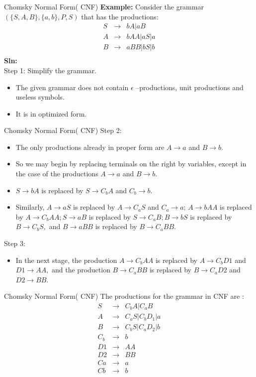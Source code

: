 \documentclass{beamer}
\begin{document}
\begin{frame}{Chomsky Normal Form( CNF)}
	\textbf{Example:}
	Consider the grammar $(\{S, A, B\}, \{a, b\}, P, S)$ that has the productions:
\begin{eqnarray*}
		S &\rightarrow&  bA | aB \\
		A &\rightarrow& bAA | aS | a\\
		B &\rightarrow&  aBB | bS | b\\
\end{eqnarray*}
\textbf{Sln:}\\
Step 1: Simplify the grammar.
\begin{itemize}
	\item The given grammar does not contain $\epsilon$ –productions, unit productions and 
	useless symbols. 
	\item It is in optimized form.
\end{itemize}
\end{frame}
\begin{frame}{Chomsky Normal Form( CNF)}
Step 2: 
\begin{itemize}
	\item The only productions already in proper form are $A\rightarrow  a$ and $B\rightarrow b.$
	\item So we may begin by replacing terminals on the right by variables, except in 
	the case of the productions $A \rightarrow  a$ and $B \rightarrow  b.$ 
	\item $S \rightarrow  bA$ is replaced by $S\rightarrow  C_bA$ and $C_b\rightarrow  b.$ 
	\item Similarly, $A\rightarrow  aS$ is replaced by $A \rightarrow  C_aS$ and $C_a\rightarrow  a$; $A\rightarrow  bAA$ is replaced by 
	$A\rightarrow C_bAA; S\rightarrow  aB$ is replaced by $S\rightarrow C_aB;
	B\rightarrow bS$ is replaced by $B\rightarrow  C_bS,$ and $B \rightarrow  aBB$ is replaced by $B\rightarrow  C_aBB.$
	
\end{itemize}
Step 3: 
\begin{itemize}
	\item In the next stage, the production $A\rightarrow C_bAA$ is replaced by $A \rightarrow  C_bD1$ and $D1\rightarrow AA,$ and the production $B\rightarrow C_aBB$ is replaced by $B\rightarrow  C_aD2$ and $D2 \rightarrow BB.
$
\end{itemize}

\end{frame}
\begin{frame}{Chomsky Normal Form( CNF)}
	The productions for the grammar in CNF are :
	\begin{eqnarray*}
		S&\rightarrow& C_bA | C_aB \\
		A &\rightarrow& C_aS | C_bD_1 | a\\
		B&\rightarrow& C_bS | C_aD_2 | b \\
		C_b&\rightarrow& b\\
		D1 &\rightarrow& AA \\
		D2 &\rightarrow& BB\\
		Ca&\rightarrow&  a\\
		Cb&\rightarrow&  b\\
	\end{eqnarray*}
\end{frame}
\end{document}
